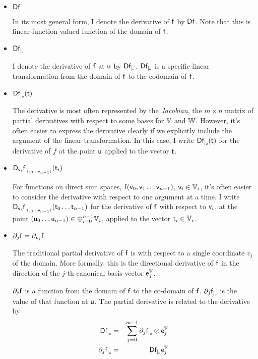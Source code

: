 \begin{itemize}

\item ${\mathsf{D}{\mathsf{f}}}$

In its most general form,
I denote the derivative of $\mathsf{f}$ by ${\mathsf{D}{\mathsf{f}}}$.
Note that this is linear-function-valued function of the domain of $\mathsf{f}$.

\item ${\mathsf{D}{\mathsf{f}}_{\mid_{\mathsf{u}}}}$

I denote the derivative of $\mathsf{f}$ at $\mathsf{u}$ by ${\mathsf{D}{\mathsf{f}}_{\mid_{\mathsf{u}}}}$.
${\mathsf{D}{\mathsf{f}}_{\mid_{\mathsf{u}}}}$ is a specific linear transformation from
the domain of $\mathsf{f}$ to the codomain of $\mathsf{f}$.

\item ${\mathsf{D}{\mathsf{f}}_{\mid_{\mathsf{u}}}({\mathsf{t}})}$

The derivative is most often represented by the \textit{Jacobian},
the $m \times n$ matrix of partial derivatives
with respect to some bases for $\mathbb{V}$ and $\mathbb{W}$.
However, it's often easier to express the derivative clearly if we
explicitly include the argument of the linear transformation.
In this case, I write ${\mathsf{D}{\mathsf{f}}_{\mid_{\mathsf{u}}}({\mathsf{t}})}$
for the derivative of $f$ at the point $\mathsf{u}$
applied to the vector $\mathsf{t}$.

\item ${\mathsf{D}_{\mathsf{v}_i}{{\mathsf{f}}}_{\mid_{(\mathsf{u}_0 \ldots \mathsf{u}_{n-1})}}({{\mathsf{t}_i}})}$

For functions on direct sum spaces,
$\mathsf{f}(\mathsf{v}_0,\mathsf{v}_1 \ldots \mathsf{v}_{n-1})$, $\mathsf{v}_i \in \mathbb{V}_i$,
it's often easier to consider the derivative
with respect to one argument at a time.
I write ${\mathsf{D}_{\mathsf{v}_i}{{\mathsf{f}}}_{\mid_{(\mathsf{u}_0 \ldots \mathsf{u}_{n-1})}}({{\mathsf{t}_0 \ldots \mathsf{t}_{n-1}}})}$
for the derivative of $\mathsf{f}$ with respect to $\mathsf{v}_i$,
at the point $(\mathsf{u}_0 \ldots \mathsf{u}_{n-1}) \in \oplus_{i=0}^{n-1} \mathbb{V}_i$,
applied to the vector $\mathsf{t}_i \in \mathbb{V}_i$.

\item ${\partial}_{j}{\mathsf{f}} = {\partial}_{v_j}{\mathsf{f}}$

The traditional partial derivative of $\mathsf{f}$ is with respect to
a single coordinate $v_j$ of the domain.
More formally, this is the directional derivative of $\mathsf{f}$
in the direction of the $j$-th canonical basis vector $\mathsf{e}_j^{\mathbb{V}}$.

${\partial}_{j}{\mathsf{f}}$ is a function from the domain of $\mathsf{f}$ to the co-domain of $\mathsf{f}$.
${\partial}_{j}{\mathsf{f}}_{\mid_{\mathsf{u}}}$ is the value of that function at $\mathsf{u}$.
The partial derivative is related to the derivative by
\begin{eqnarray}
\label{eq:partial-full-dervatives}
{\mathsf{D}{\mathsf{f}}_{\mid_{\mathsf{u}}}}
& = &
\sum_{j=0}^{m-1} {\partial}_{j}{\mathsf{f}}_{\mid_{\mathsf{u}}} \otimes \mathsf{e}_j^{\mathbb{V}}
\\
{\partial}_{j}{\mathsf{f}}_{\mid_{\mathsf{u}}}
& = &
{\mathsf{D}{\mathsf{f}}_{\mid_{\mathsf{u}}}} \mathsf{e}_j^{\mathbb{V}}
\nonumber
\end{eqnarray}


\end{itemize}
